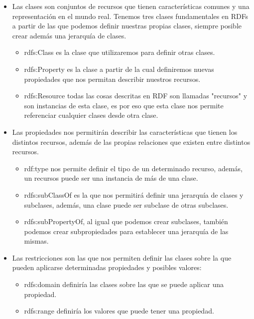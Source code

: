 \newpage
\begin{itemize}
	\item Las clases son conjuntos de recursos que tienen características comunes y una representación en el mundo real. Tenemos tres clases fundamentales en RDFs a partir de las que podemos definir nuestras propias clases, siempre posible crear además una jerarquía de clases.
	\begin{itemize}
		\item rdfs:Class es la clase que utilizaremos para definir otras clases.
		\item rdfs:Property es la clase a partir de la cual definiremos nuevas propiedades que nos permitan describir nuestros recursos.
		\item rdfs:Resource todas las cosas descritas en RDF son llamadas "recursos" y son instancias de esta clase, es por eso que esta clase nos permite referenciar cualquier clases desde otra clase.
	\end{itemize}
	
	\item Las propiedades nos permitirán describir las características que tienen los distintos recursos, además de las propias relaciones que existen entre distintos recursos.
	\begin{itemize}
		\item rdf:type nos permite definir el tipo de un determinado recurso, además, un recursos puede ser una instancia de más de una clase.
		\item rdfs:subClassOf es la que nos permitirá definir una jerarquía de clases y subclases, además, una clase puede ser subclase de otras subclases.
		\item rdfs:subPropertyOf, al igual que podemos crear subclases, también podemos crear subpropiedades para establecer una jerarquía de las mismas.
	\end{itemize}
	
	\item Las restricciones son las que nos permiten definir las clases sobre la que pueden aplicarse determinadas propiedades y posibles valores:
	\begin{itemize}
		\item rdfs:domain definiría las clases sobre las que se puede aplicar una propiedad.
		\item rdfs:range definiría los valores que puede tener una propiedad.
	\end{itemize}
\end{itemize}

